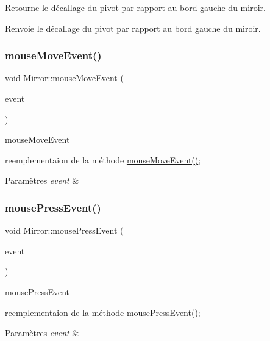 Retourne le décallage du pivot par rapport au bord gauche du miroir. \begin{DoxyReturn}{Renvoie}
le décallage du pivot par rapport au bord gauche du miroir. 
\end{DoxyReturn}
\mbox{\label{class_mirror_a01f6bab84d3b879a31c146cfad70d253}} 
\subsubsection{\texorpdfstring{mouseMoveEvent()}{mouseMoveEvent()}}
{\footnotesize\ttfamily void Mirror\+::mouse\+Move\+Event (\begin{DoxyParamCaption}\item[{Q\+Graphics\+Scene\+Mouse\+Event $\ast$}]{event }\end{DoxyParamCaption})}



mouse\+Move\+Event 

reemplementaion de la méthode \mbox{\hyperlink{class_mirror_a01f6bab84d3b879a31c146cfad70d253}{mouse\+Move\+Event()}}; 
\begin{DoxyParams}{Paramètres}
{\em event} & \\
\hline
\end{DoxyParams}
\mbox{\label{class_mirror_ac19e2b03e9ad9657d87b80a76115060f}} 
\subsubsection{\texorpdfstring{mousePressEvent()}{mousePressEvent()}}
{\footnotesize\ttfamily void Mirror\+::mouse\+Press\+Event (\begin{DoxyParamCaption}\item[{Q\+Graphics\+Scene\+Mouse\+Event $\ast$}]{event }\end{DoxyParamCaption})}



mouse\+Press\+Event 

reemplementaion de la méthode \mbox{\hyperlink{class_mirror_ac19e2b03e9ad9657d87b80a76115060f}{mouse\+Press\+Event()}}; 
\begin{DoxyParams}{Paramètres}
{\em event} & \\
\hline
\end{DoxyParams}
\mbox{\label{class_mirror_a21063bba2c74360441c6621c4bc735be}} 

